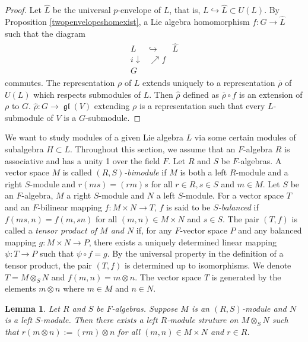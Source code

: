 \documentclass[12pt,MSc]{muthesis_2023}
\theoremstyle{plain}%
\newtheorem{Lemma}[FactCounter]{Lemma} %
\theoremstyle{definition}
\theoremstyle{remark}
\DeclareMathOperator{\gl}{\mathfrak{gl}}
\begin{document}
\begin{proof}
Let $\widehat{L}$ be the universal $p$-envelope of $L$, that is, $L \hookrightarrow \widehat{L}\subset U(L)$. By Proposition \ref{twopenvelopeshomexist}, a Lie algebra homomorphism $f: G \rightarrow \widehat{L}$ such that the diagram
\begin{align*}
\begin{matrix}
L & \hookrightarrow & \widehat{L}\\
i\downarrow &\nearrow f&  \\
G
\end{matrix}
\end{align*}
commutes. The representation $\rho$ of $L$ extends uniquely to a representation $\overline{\rho}$ of $U(L)$ which respects submodules of $L$. Then $\widehat{\rho}$ defined as $\overline{\rho}\circ f$ is an extension of $\rho$ to $G$. $\widehat{\rho}:G \rightarrow \gl(V)$ extending $\rho$ is a representation such that every $L$-submodule of $V$ is a $G$-submodule.

\end{proof}


We want to study modules of a given Lie algebra $L$ via some certain modules of subalgebra $H\subset L$. Throughout this section, we assume that an $F$-algebra $R$ is associative and has a unity 1 over the field $F$. Let $R$ and $S$ be $F$-algebras. A vector space $M$ is called \textit{$(R,S)$-bimodule}
if $M$ is both a left $R$-module and a right $S$-module and $r(ms)=(rm)s$ for all $r\in R, s\in S$ and $m\in M$. Let $S$ be an $F$-algebra, $M$ a right $S$-module and $N$ a left $S$-module. For a vector space $T$ and an $F$-bilinear mapping $f: M\times N \rightarrow T$, $f$ is said to be \textit{$S$-balanced} if $f(ms, n)=f(m,sn)$ for all $(m,n)\in M\times N$ and $s\in S$. The pair $(T,f)$ is called a \textit{tensor product of $M$ and $N$} if, for any $F$-vector space $P$ and any balanced mapping $g:M\times N\rightarrow P$, there exists a uniquely determined linear mapping $\psi:T\rightarrow P$ such that $\psi\circ f=g$. By the universal property in the definition of a tensor product, the pair $(T,f)$ is determined up to isomorphisms. We denote $T=M\otimes_S N$ and $f(m,n)=m\otimes n$. The vector space $T$ is generated by the elements $m\otimes n$ where $m\in M$ and $n\in N$.

\begin{Lemma}\label{rmodulestructureontensorproduct}
Let $R$ and $S$ be $F$-algebras. Suppose $M$ is an $(R,S)$-module and $N$ is a left $S$-module. Then there exists a left $R$-module struture on $M\otimes_S N$ such that $r(m\otimes n) := (rm)\otimes n$ for all $(m,n)\in M\times N$ and $r\in R$.
\end{Lemma}
\end{document}
